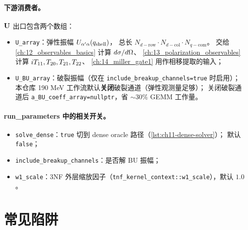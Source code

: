 \paragraph{下游消费者。}
\(\mathbf{U}\) 出口包含两个数组：
\begin{itemize}
  \item \texttt{U\_array}：弹性振幅 \(U_{\alpha'\alpha}(q_{\text{shell}})\)，
        总长 \(N_{d-\text{row}} \cdot N_{d-\text{col}} \cdot N_{q-\text{com}}\)。
        交给 \cref{ch:12_observables_basics} 计算 \(d\sigma/d\Omega\)、
        \cref{ch:13_polarization_observables} 计算 \({i T_{11}}, {T_{20}}, {T_{21}}, {T_{22}}\)、
        \cref{ch:14_miller_gate1} 用作相移提取的输入；
  \item \texttt{U\_BU\_array}：破裂振幅（仅在 \texttt{include\_breakup\_channels=true} 时启用）；
        本仓库 190 MeV 工作流默认\textbf{关闭}破裂通道（弹性观测量足够）；
        关闭破裂通道后 \texttt{a\_BU\_coeff\_array=nullptr}，省 \(\sim 30\%\) GEMM 工作量。
\end{itemize}

\paragraph{run\_parameters 中的相关开关。}
\begin{itemize}
  \item \texttt{solve\_dense}：\texttt{true} 切到 dense oracle 路径（\cref{lst:ch11-dense-solver}）；
        默认 \texttt{false}；
  \item \texttt{include\_breakup\_channels}：是否解 BU 振幅；
  \item \texttt{w1\_scale}：3NF 外层缩放因子（\texttt{tnf\_kernel\_context::w1\_scale}），默认 \(1.0\)。
\end{itemize}

\section{常见陷阱}
\label{sec:ch11-pitfalls}

